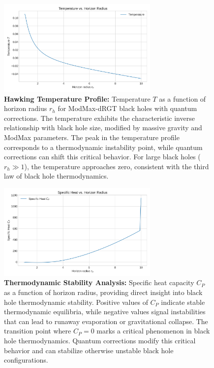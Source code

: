 \documentclass[12pt]{article}
\begin{document}
\begin{figure}[H]
    \centering
    \includegraphics[width=0.7\textwidth]{figures/temperature_vs_rh.png}
    \caption{\textbf{Hawking Temperature Profile:} Temperature $T$ as a function of horizon radius $r_h$ for ModMax-dRGT black holes with quantum corrections. The temperature exhibits the characteristic inverse relationship with black hole size, modified by massive gravity and ModMax parameters. The peak in the temperature profile corresponds to a thermodynamic instability point, while quantum corrections can shift this critical behavior. For large black holes ($r_h \gg 1$), the temperature approaches zero, consistent with the third law of black hole thermodynamics.}
    \label{fig:temperature_vs_rh}
\end{figure}

\begin{figure}[H]
    \centering
    \includegraphics[width=0.7\textwidth]{figures/specific_heat_vs_rh.png}
    \caption{\textbf{Thermodynamic Stability Analysis:} Specific heat capacity $C_P$ as a function of horizon radius, providing direct insight into black hole thermodynamic stability. Positive values of $C_P$ indicate stable thermodynamic equilibria, while negative values signal instabilities that can lead to runaway evaporation or gravitational collapse. The transition point where $C_P = 0$ marks a critical phenomenon in black hole thermodynamics. Quantum corrections modify this critical behavior and can stabilize otherwise unstable black hole configurations.}
    \label{fig:specific_heat_vs_rh}
\end{figure}
\end{document}
